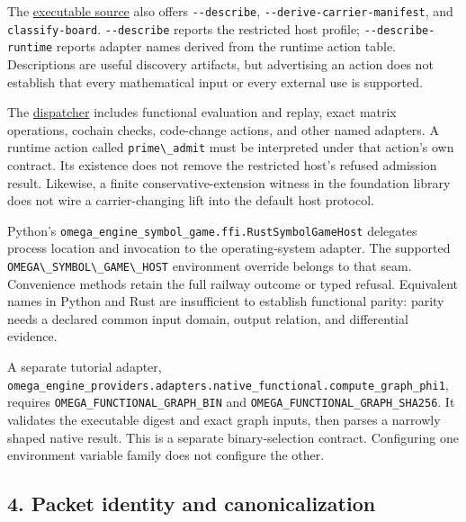 \documentclass[
  11pt,
]{article}
\newcommand{\passthrough}[1]{#1}
\begin{document}
The
\href{https://github.com/dbccpage/the_symbol_game/blob/52cb5457f6c485ba548cfd292f6012a941ed22cf/omega_engine/crates_rs/omega_symbol_game/src/main.rs}{executable
source} also offers \passthrough{\lstinline!--describe!},
\passthrough{\lstinline!--derive-carrier-manifest!}, and
\passthrough{\lstinline!classify-board!}.
\passthrough{\lstinline!--describe!} reports the restricted host
profile; \passthrough{\lstinline!--describe-runtime!} reports adapter
names derived from the runtime action table. Descriptions are useful
discovery artifacts, but advertising an action does not establish that
every mathematical input or every external use is supported.

The
\href{https://github.com/dbccpage/the_symbol_game/blob/52cb5457f6c485ba548cfd292f6012a941ed22cf/omega_engine/crates_rs/omega_symbol_game/src/invoke.rs}{dispatcher}
includes functional evaluation and replay, exact matrix operations,
cochain checks, code-change actions, and other named adapters. A runtime
action called \passthrough{\lstinline!prime\_admit!} must be interpreted
under that action's own contract. Its existence does not remove the
restricted host's refused admission result. Likewise, a finite
conservative-extension witness in the foundation library does not wire a
carrier-changing lift into the default host protocol.

Python's \nolinkurl{omega_engine_symbol_game.ffi.RustSymbolGameHost}
delegates process location and invocation to the operating-system
adapter. The supported
\passthrough{\lstinline!OMEGA\_SYMBOL\_GAME\_HOST!} environment override
belongs to that seam. Convenience methods retain the full railway
outcome or typed refusal. Equivalent names in Python and Rust are
insufficient to establish functional parity: parity needs a declared
common input domain, output relation, and differential evidence.

A separate tutorial adapter,
\nolinkurl{omega_engine_providers.adapters.native_functional.compute_graph_phi1},
requires \nolinkurl{OMEGA_FUNCTIONAL_GRAPH_BIN} and
\nolinkurl{OMEGA_FUNCTIONAL_GRAPH_SHA256}. It validates the executable
digest and exact graph inputs, then parses a narrowly shaped native
result. This is a separate binary-selection contract. Configuring one
environment variable family does not configure the other.

\subsection{4. Packet identity and
canonicalization}\label{packet-identity-and-canonicalization}
\end{document}
